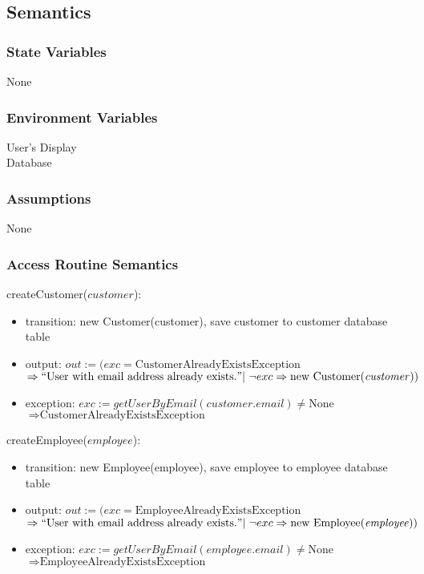 \documentclass[12pt, titlepage]{article}
\begin{document}
\subsection{Semantics}

\subsubsection{State Variables}

None

\subsubsection{Environment Variables}

User's Display \\ Database

\subsubsection{Assumptions}

None

\subsubsection{Access Routine Semantics}

\noindent createCustomer($customer$):
\begin{itemize}
	\item transition: new Customer(customer), save customer to customer database table
	\item output: $out := (exc = \text{CustomerAlreadyExistsException}$ \\ $\Rightarrow ``\text{User with
			      email address already exists.}" |\ \neg exc \Rightarrow \text{new Customer(\emph{customer})})$
	\item exception: $exc := getUserByEmail(customer.email) \neq \text{None}$ \\ $\Rightarrow
		      \text{CustomerAlreadyExistsException}$
\end{itemize}

\noindent createEmployee($employee$):
\begin{itemize}
	\item transition: new Employee(employee), save employee to employee database table
	\item output: $out := (exc = \text{EmployeeAlreadyExistsException}$ \\ $\Rightarrow ``\text{User with
			      email address already exists.}" |\ \neg exc \Rightarrow \text{new Employee(\emph{employee})})$
	\item exception: $exc := getUserByEmail(employee.email) \neq \text{None}$ \\ $\Rightarrow
		      \text{EmployeeAlreadyExistsException}$
\end{itemize}
\end{document}

